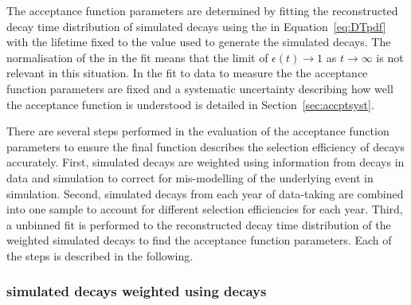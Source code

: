 The acceptance function parameters are determined by fitting the reconstructed decay time distribution of simulated decays using the \pdf in Equation~\ref{eq:DTpdf} with the lifetime fixed to the value used to generate the simulated decays. The normalisation of the \pdf in the fit means that the limit of $\epsilon(t) \rightarrow 1$ as $t \rightarrow \infty$ is not relevant in this situation.
In the fit to data to measure the \el the acceptance function parameters are fixed and a systematic uncertainty describing how well the acceptance function is understood is detailed in Section~\ref{sec:accptsyst}.


There are several steps performed in the evaluation of the acceptance function parameters to ensure the final function describes the selection efficiency of \bsmumu decays accurately.
First, simulated \bsmumu decays are weighted using information from \bdkpi decays in data and simulation to correct for mis-modelling of the underlying event in simulation. Second, simulated \bsmumu decays from each year of data-taking are combined into one sample to account for different selection efficiencies for each year. Third, a unbinned \ml fit is performed to the reconstructed decay time distribution of the weighted simulated decays to find the acceptance function parameters. Each of the steps is described in the following.


\subsubsection*{\boldmath{\bsmumu} simulated decays weighted using \boldmath{\bdkpi} decays}


